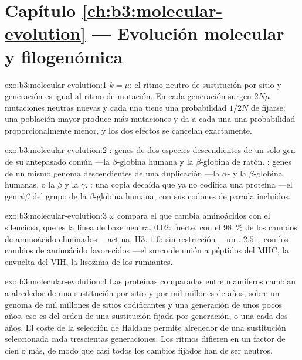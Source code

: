 \section*{Capítulo \ref{ch:b3:molecular-evolution} --- Evolución molecular y filogenómica}

\begin{solution}{exo:b3:molecular-evolution:1}
$k = \mu$: el ritmo neutro de sustitución por sitio y generación es
igual al ritmo de mutación. En cada generación surgen $2N\mu$ mutaciones
neutras nuevas y cada una tiene una probabilidad $1/2N$ de fijarse; una
población mayor produce más mutaciones y da a cada una una probabilidad
proporcionalmente menor, y los dos efectos se cancelan exactamente.
\end{solution}

\begin{solution}{exo:b3:molecular-evolution:2}
: genes de dos especies descendientes de un solo gen de su
antepasado común ---la $\beta$-globina humana y la $\beta$-globina de
ratón. : genes de un mismo genoma descendientes de una
duplicación ---la $\alpha$- y la $\beta$-globina humanas, o la $\beta$ y
la $\gamma$. : una copia decaída que ya no codifica una proteína
---el gen $\psi\beta$ del grupo de la $\beta$-globina humana, con sus
codones de parada incluidos.
\end{solution}

\begin{solution}{exo:b3:molecular-evolution:3}
$\omega$ compara el  que cambia aminoácidos con el
 silenciosa, que es la línea de base neutra.
$0.02$:  fuerte, con el \qty{98}{\%} de los
cambios de aminoácido eliminados ---actina,  H3. $1.0$: sin
restricción ---un . $2.5$: , con los cambios
de aminoácido favorecidos ---el surco de unión a péptidos del MHC, la
envuelta del VIH, la lisozima de los rumiantes.
\end{solution}

\begin{solution}{exo:b3:molecular-evolution:4}
Las proteínas comparadas entre mamíferos cambian a alrededor de una
sustitución por sitio y por mil millones de años; sobre un genoma de
mil millones de sitios codificantes y una generación de unos pocos
años, eso es del orden de una sustitución fijada por generación, o una
cada dos años. El coste de la selección de Haldane permite alrededor de
una sustitución seleccionada cada trescientas generaciones. Los ritmos
difieren en un factor de cien o más, de modo que casi todos los cambios
fijados han de ser neutros.
\end{solution}

